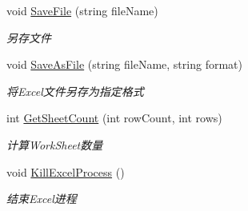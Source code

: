 \begin{DoxyCompactItemize}
void \hyperlink{class_x_c_l_net_tools_1_1_office_1_1_excel_handler_1_1_excel_helper_a742f97d7ca4451c93efcfe05be0e7235}{Save\+File} (string file\+Name)
\begin{DoxyCompactList}\small\item\em 另存文件 \end{DoxyCompactList}\item 
void \hyperlink{class_x_c_l_net_tools_1_1_office_1_1_excel_handler_1_1_excel_helper_a3d543e54860a7a9d7fca6abd2adff0db}{Save\+As\+File} (string file\+Name, string format)
\begin{DoxyCompactList}\small\item\em 将\+Excel文件另存为指定格式 \end{DoxyCompactList}\item 
int \hyperlink{class_x_c_l_net_tools_1_1_office_1_1_excel_handler_1_1_excel_helper_a3192422a44e6781c0242c76afaafa1a6}{Get\+Sheet\+Count} (int row\+Count, int rows)
\begin{DoxyCompactList}\small\item\em 计算\+Work\+Sheet数量 \end{DoxyCompactList}\item 
void \hyperlink{class_x_c_l_net_tools_1_1_office_1_1_excel_handler_1_1_excel_helper_a2796fbae8cdad3f7740bd6f28cef5956}{Kill\+Excel\+Process} ()
\begin{DoxyCompactList}\small\item\em 结束\+Excel进程 \end{DoxyCompactList}\end{DoxyCompactItemize}
